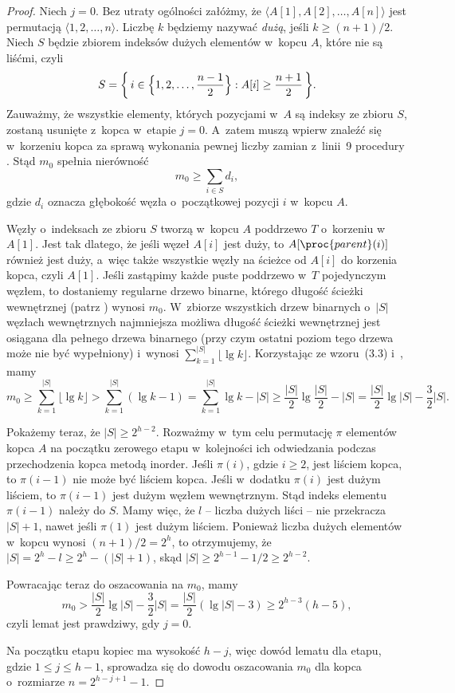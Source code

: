 \begin{proof}
Niech $j=0$. Bez utraty ogólności załóżmy, że $\langle A[1],A[2],\dots,A[n]\rangle$ jest permutacją $\langle1,2,\dots,n\rangle$. Liczbę $k$ będziemy nazywać \emph{dużą}, jeśli $k\ge(n+1)/2$. Niech $S$ będzie zbiorem indeksów dużych elementów w~kopcu $A$, które nie są liśćmi, czyli
\[
    S = \biggl\{\,i\in\Bigl\{1,2,\dots,\frac{n-1}{2}\Bigr\}:A[i]\ge\frac{n+1}{2}\,\biggr\}.
\]
Zauważmy, że wszystkie elementy, których pozycjami w~$A$ są indeksy ze zbioru $S$, zostaną usunięte z~kopca w~etapie $j=0$. A~zatem muszą wpierw znaleźć się w~korzeniu kopca za sprawą wykonania pewnej liczby zamian z~linii~9 procedury . Stąd $m_0$ spełnia nierówność
\[
    m_0 \ge \sum_{i\in S}d_i,
\]
gdzie $d_i$ oznacza głębokość węzła o~początkowej pozycji $i$ w~kopcu $A$.

Węzły o~indeksach ze zbioru $S$ tworzą w~kopcu $A$ poddrzewo $T$ o~korzeniu w~$A[1]$. Jest tak dlatego, że jeśli węzeł $A[i]$ jest duży, to $A[\proc{parent}(i)]$ również jest duży, a~więc także wszystkie węzły na ścieżce od $A[i]$ do korzenia kopca, czyli $A[1]$. Jeśli zastąpimy każde puste poddrzewo w~$T$ pojedynczym węzłem, to dostaniemy regularne drzewo binarne, którego długość ścieżki wewnętrznej (patrz ) wynosi $m_0$. W~zbiorze wszystkich drzew binarnych o~$|S|$ węzłach wewnętrznych najmniejsza możliwa długość ścieżki wewnętrznej jest osiągana dla pełnego drzewa binarnego (przy czym ostatni poziom tego drzewa może nie być wypełniony) i~wynosi $\sum_{k=1}^{|S|}\lfloor\lg k\rfloor$. Korzystając ze wzoru~(3.3) i~, mamy
\[
    m_0 \ge \sum_{k=1}^{|S|}\lfloor\lg k\rfloor > \sum_{k=1}^{|S|}(\lg k-1) = \sum_{k=1}^{|S|}\lg k-|S| \ge \frac{|S|}{2}\lg\frac{|S|}{2}-|S| = \frac{|S|}{2}\lg|S|-\frac{3}{2}|S|.
\]

Pokażemy teraz, że $|S|\ge2^{h-2}$. Rozważmy w~tym celu permutację $\pi$ elementów kopca $A$ na początku zerowego etapu w~kolejności ich odwiedzania podczas przechodzenia kopca metodą inorder. Jeśli $\pi(i)$, gdzie $i\ge2$, jest liściem kopca, to $\pi(i-1)$ nie może być liściem kopca. Jeśli w~dodatku $\pi(i)$ jest dużym liściem, to $\pi(i-1)$ jest dużym węzłem wewnętrznym. Stąd indeks elementu $\pi(i-1)$ należy do $S$. Mamy więc, że $l$ -- liczba dużych liści -- nie przekracza $|S|+1$, nawet jeśli $\pi(1)$ jest dużym liściem. Ponieważ liczba dużych elementów w~kopcu wynosi $(n+1)/2=2^h$, to otrzymujemy, że $|S|=2^h-l\ge2^h-(|S|+1)$, skąd $|S|\ge2^{h-1}-1/2\ge2^{h-2}$.

Powracając teraz do oszacowania na $m_0$, mamy
\[
    m_0 > \frac{|S|}{2}\lg|S|-\frac{3}{2}|S| = \frac{|S|}{2}(\lg|S|-3) \ge 2^{h-3}(h-5),
\]
czyli lemat jest prawdziwy, gdy $j=0$.

Na początku  etapu kopiec ma wysokość $h-j$, więc dowód lematu dla  etapu, gdzie $1\le j\le h-1$, sprowadza się do dowodu oszacowania $m_0$ dla kopca o~rozmiarze $n=2^{h-j+1}-1$.
\end{proof}

